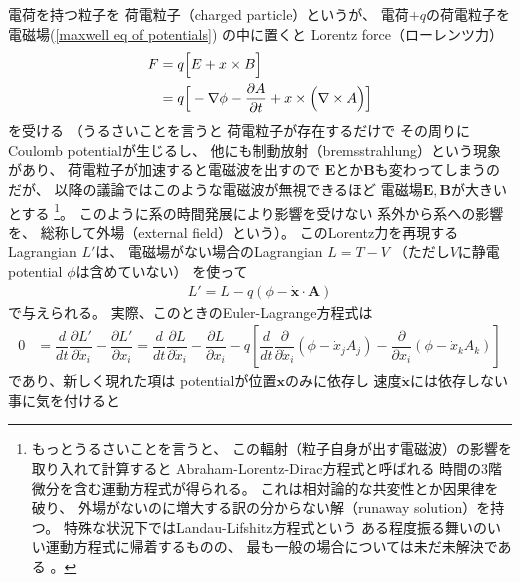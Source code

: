 電荷を持つ粒子を
荷電粒子（charged particle）というが、
電荷$+q$の荷電粒子を
電磁場(\ref{maxwell eq of potentials})
の中に置くと
Lorentz force（ローレンツ力）
\begin{align}
  F
  &=
  q
  \Big[
    E
  +
   x
    \times
    B
  \Big]
\notag\\&=
  q
  \Big[
    - \nabla\phi
    - \dfrac{\partial A}
      {\partial t}
  +
   x
    \times
    \Big(
      \nabla \times A
    \Big)
  \Big]
\label{lorentz force for charged point particle}
\end{align}
を受ける
（うるさいことを言うと
荷電粒子が存在するだけで
その周りにCoulomb potentialが生じるし、
他にも制動放射（bremsstrahlung）という現象があり、
荷電粒子が加速すると電磁波を出すので
$\bm{E}$とか$\bm{B}$も変わってしまうのだが、
以降の議論ではこのような電磁波が無視できるほど
電磁場$\bm{E}, \bm{B}$が大きいとする
\footnote{
  もっとうるさいことを言うと、
  この輻射（粒子自身が出す電磁波）の影響を取り入れて計算すると
  Abraham-Lorentz-Dirac方程式と呼ばれる
  時間の3階微分を含む運動方程式が得られる。
  これは相対論的な共変性とか因果律を破り、
  外場がないのに増大する訳の分からない解（runaway solution）を持つ。
  特殊な状況下ではLandau-Lifshitz方程式という
  ある程度振る舞いのいい運動方程式に帰着するものの、
  最も一般の場合については未だ未解決である
  \cite{Abraham-Lorentz}。
  }。
このように系の時間発展により影響を受けない
系外から系への影響を、
総称して外場（external field）という）。
このLorentz力を再現するLagrangian $L'$は、
電磁場がない場合のLagrangian $L = T - V$
（ただし$V$に静電potential $\phi$は含めていない）
を使って
\begin{align}
  L' = L - q(\phi - \dot{\bm{x}} \cdot \bm{A})
\label{point particle lagrangian with ele-mag potential}
\end{align}
で与えられる。
実際、このときのEuler-Lagrange方程式は
\begin{align}
  0
&=
  \dfrac{d}{dt}
    \dfrac{\partial L'}{\partial \dot{x}_i}
  -
    \dfrac{\partial L'}{\partial x_i}
=
  \dfrac{d}{dt}
    \dfrac{\partial L}{\partial \dot{x}_i}
  -
    \dfrac{\partial L}{\partial x_i}
- q \left[
  \dfrac{d}{dt}
    \dfrac{\partial}{\partial \dot{x}_i}
      (\phi - \dot{x}_j A_j)
  -
    \dfrac{\partial}{\partial x_i}
      (\phi - \dot{x}_k A_k)
\right]
\label{EL eq for charged point particle}
\end{align}
であり、新しく現れた項は
potentialが位置$\bm{x}$のみに依存し
速度$\dot{\bm{x}}$には依存しない事に気を付けると
